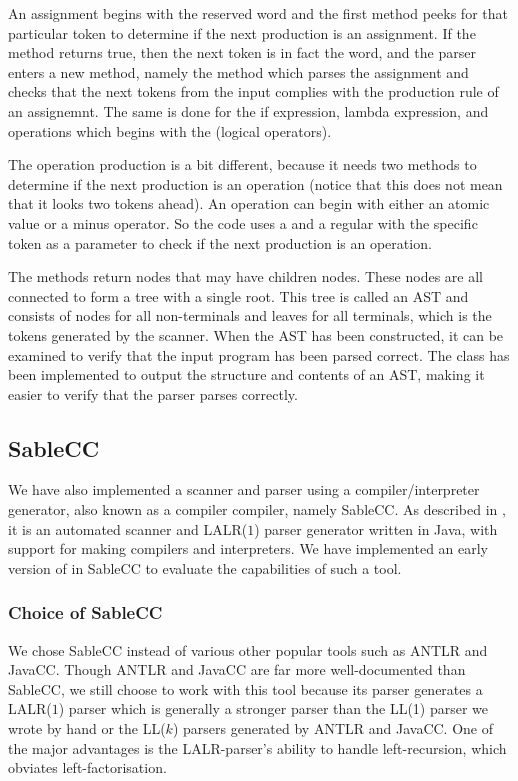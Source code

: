 An assignment begins with the reserved word  and the first
 method peeks for that particular token to determine if the
next production is an assignment. If the method returns true, then the next
token is in fact the  word, and the parser enters a new method, namely
the  method which parses the assignment and checks that
the next tokens from the input complies with the production rule of an
assignemnt. The same is done for the if expression, lambda expression, and
operations which begins with the  (logical operators).

The operation production is a bit different, because it needs two
 methods to determine if the next production is an
operation (notice that this does not mean that it looks two tokens ahead). An
operation can begin with either an atomic value or a minus operator. So the code
uses a  and a regular  with the
specific token as a parameter to check if the next production is an operation.

The methods return nodes that may have children nodes. These nodes are all
connected to form a tree with a single root.  This tree is called an AST and
consists of nodes for all non-terminals and leaves for all terminals, which is
the tokens generated by the scanner.  When the AST has been constructed, it can
be examined to verify that the input program has been parsed correct. The class
 has been implemented to output the structure and
contents of an AST, making it easier to verify that the parser parses correctly.

\subsection{SableCC}
We have also implemented a scanner and parser using a
compiler/interpreter generator, also known as a compiler compiler, namely
SableCC\cite{sableccdoc}. As described in
, it is an automated scanner and
LALR($1$) parser generator written in Java, with support for making
compilers and interpreters. We have implemented an early version of
\productname{} in SableCC to evaluate the capabilities of such a tool.

\subsubsection{Choice of SableCC}
We chose SableCC instead of various other popular tools such as
ANTLR\cite{antlr} and JavaCC\cite{javacc}. Though ANTLR and JavaCC are far more
well-documented than SableCC, we still choose to work with this tool because its
parser generates a LALR($1$) parser which is generally a stronger parser than
the LL(1) parser we wrote by hand or the LL($k$) parsers generated by ANTLR and
JavaCC. One of the major advantages is the LALR-parser's ability to handle
left-recursion, which obviates left-factorisation.

